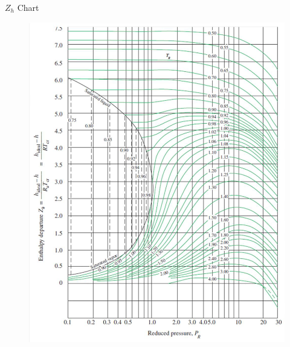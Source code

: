 $Z_h$ Chart 
\begin{figure}[H]
    \centering
    \includegraphics[width=1.0\linewidth]{images/Z_h_table.png}
\end{figure}

